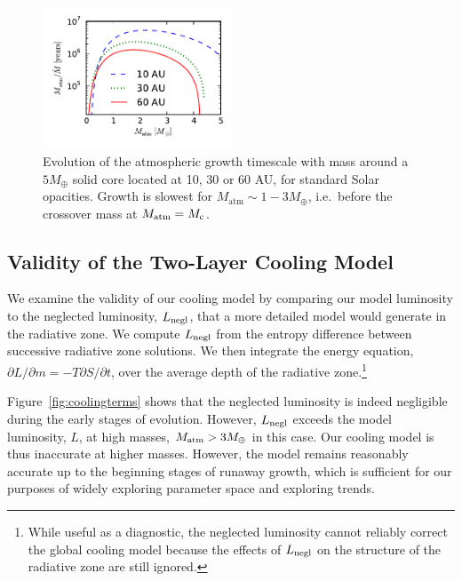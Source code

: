 \documentclass[apj, numberedappendix]{emulateapj}
\newcommand{\p}{\partial}
\newcommand{\Fig}[1]{Figure~\ref{#1}}
\newcommand{\Figs}[2]{Figs.~\ref{#1} and \ref{#2}}
\newcommand{\co}{_{\rm c}}
\begin{document}

\begin{figure}[tb]
\centering
\includegraphics[width=0.5\textwidth]{../../figs/ModelAtmospheres/RadSelfGravPoly/PaperFigs/Mt_profile_temp.pdf}
\caption{Evolution of the atmospheric growth timescale with mass around a $5 M_{\oplus}$ solid core  located at 10, 30 or 60 AU, for standard Solar opacities.  Growth is slowest for $M_{\mathrm{atm}} \sim 1 - 3 M_{\oplus}$, i.e.\ before the crossover mass at $M_{\rm atm} = M\co$.}
\label{fig:growthtime}
\end{figure}

\subsection{Validity of the Two-Layer Cooling Model}
\label{sec:endoftime}

We examine the  validity of our cooling model by comparing our model luminosity to the neglected luminosity, $L_{\rm negl}$,  that a more detailed model would generate in the radiative zone.  We compute $L_{\rm negl}$ from the entropy difference between successive radiative zone solutions.  We then integrate the energy equation, $\p L / \p m = - T \p S/ \p t$, over the average depth of the radiative zone.\footnote{While useful as a diagnostic, the neglected luminosity cannot reliably correct the global cooling model because the effects of $L_{\rm negl}$ on the structure of the radiative zone are still ignored.}

 \Fig{fig:coolingterms} shows that the neglected luminosity is indeed negligible during the early stages of evolution.  However, $L_{\rm negl}$ exceeds the model luminosity, $L$, at high masses, $M_{\rm atm} > 3 M_\oplus$ in this case.  Our cooling model is thus inaccurate at higher masses.  However, the model remains reasonably accurate up to the beginning stages of runaway growth, which is sufficient for our purposes of widely exploring parameter space and exploring trends.
 
\end{document}
